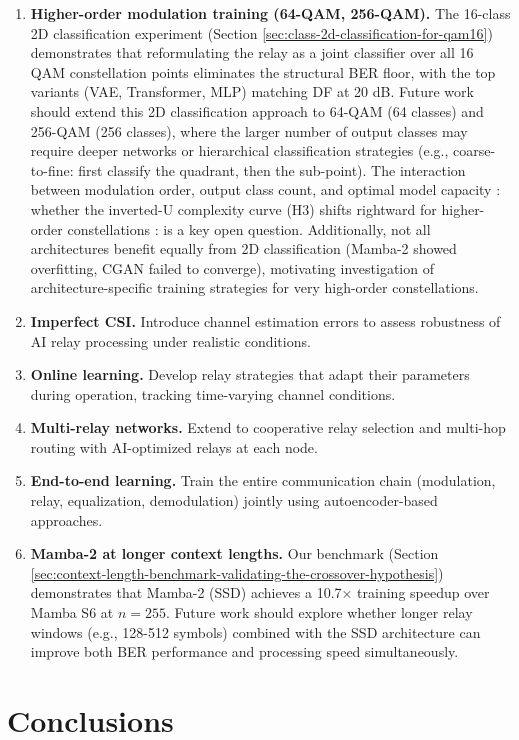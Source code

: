\begin{enumerate}
\def\labelenumi{\arabic{enumi}.}
\item
  \textbf{Higher-order modulation training (64-QAM, 256-QAM).} The 16-class 2D classification experiment (Section \ref{sec:class-2d-classification-for-qam16}) demonstrates that reformulating the relay as a joint classifier over all 16 QAM constellation points eliminates the structural BER floor, with the top variants (VAE, Transformer, MLP) matching DF at 20 dB. Future work should extend this 2D classification approach to 64-QAM (64 classes) and 256-QAM (256 classes), where the larger number of output classes may require deeper networks or hierarchical classification strategies (e.g., coarse-to-fine: first classify the quadrant, then the sub-point). The interaction between modulation order, output class count, and optimal model capacity : whether the inverted-U complexity curve (H3) shifts rightward for higher-order constellations : is a key open question. Additionally, not all architectures benefit equally from 2D classification (Mamba-2 showed overfitting, CGAN failed to converge), motivating investigation of architecture-specific training strategies for very high-order constellations.
\item
  \textbf{Imperfect CSI.} Introduce channel estimation errors to assess robustness of AI relay processing under realistic conditions.
\item
  \textbf{Online learning.} Develop relay strategies that adapt their parameters during operation, tracking time-varying channel conditions.
\item
  \textbf{Multi-relay networks.} Extend to cooperative relay selection and multi-hop routing with AI-optimized relays at each node.
\item
  \textbf{End-to-end learning.} Train the entire communication chain (modulation, relay, equalization, demodulation) jointly using autoencoder-based approaches.
\item
  \textbf{Mamba-2 at longer context lengths.} Our benchmark (Section \ref{sec:context-length-benchmark-validating-the-crossover-hypothesis}) demonstrates that Mamba-2 (SSD) achieves a 10.7× training speedup over Mamba S6 at \(n = 255\). Future work should explore whether longer relay windows (e.g., 128-512 symbols) combined with the SSD architecture can improve both BER performance and processing speed simultaneously.
\end{enumerate}

\section{Conclusions}\label{sec:conclusions}

